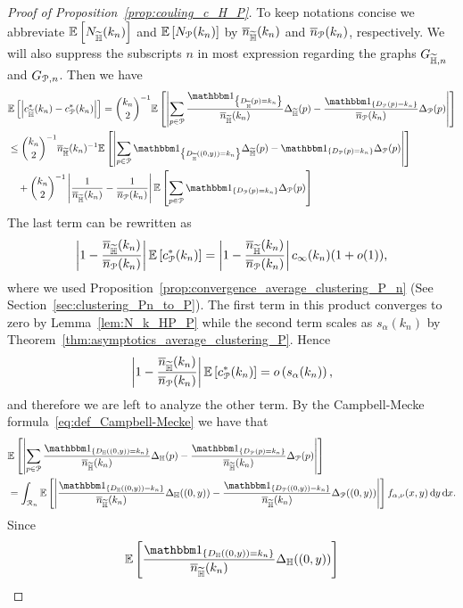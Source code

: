 \begin{proof}[Proof of Proposition~\ref{prop:couling_c_H_P}] 

To keep notations concise we abbreviate $\mathbb{E}\left[N_{\widetilde{\mathbb{H}}} (k_n)\right]$ and $\mathbb{E}\left[N_{{\mathcal P}} (k_n)\right]$ by $\overline{n}_{\widetilde{\mathbb{H}}}(k_n)$ and $\overline{n}_{{\mathcal P}}(k_n)$, respectively. We will also suppress the subscripts $n$ in most expression regarding the graphs $G_{\widetilde{\mathbb{H}},n}$ and $G_{{\mathcal P},n}$. Then we have
\begin{align*} 
	&\Exp{\left|  c_{\HP}^\ast(k_n) - c_{\Pcal}^\ast(k_n)\right|}= 
	\binom{k_n}{2}^{-1}\Exp{\left|\sum_{p \in \Pcal} 
    	\frac{\ind{D_{\HP}(p) = k_n}}{\expH} \Delta_{\HP}(p )
        - \frac{\ind{D_\Pcal(p) = k_n}}{\expP}  \Delta_\Pcal(p)\right|} \\
    &\le\binom{k_n}{2}^{-1} \expH^{-1} \Exp{\left|\sum_{p \in \Pcal} \ind{D_{\HP}((0,y)) = k_n} \Delta_{\HP}(p) 
    	- \ind{D_\Pcal(p) = k_n} \Delta_\Pcal(p)\right|} \\
    &\hspace{10pt}+ \binom{k_n}{2}^{-1} \left|\frac{1}{\expH} - \frac{1}{\expP}\right|\Exp{
        	\sum_{p \in \Pcal} \ind{D_\Pcal(p) = k_n} \Delta_\Pcal(p) }
\end{align*}
The last term can be rewritten as
\begin{align*}
	\left|1 - \frac{\overline{n}_{\widetilde{\mathbb{H}}}(k_n)}{\overline{n}_{{\mathcal P}}(k_n)}\right| \mathbb{E}\left[c_{{\mathcal P}}^\ast(k_n)\right] = \left|1 - \frac{\overline{n}_{\widetilde{\mathbb{H}}}(k_n)}{\overline{n}_{{\mathcal P}}(k_n)}\right|c_\infty(k_n)(1+o(1)),
\end{align*}
where we used Proposition~\ref{prop:convergence_average_clustering_P_n} (See Section~\ref{sec:clustering_Pn_to_P}). The first term in this product converges to zero by Lemma~\ref{lem:N_k_HP_P} while the second term scales as $s_\alpha(k_n)$ by Theorem~\ref{thm:asymptotics_average_clustering_P}. Hence
\[
	\left|1 - \frac{\overline{n}_{\widetilde{\mathbb{H}}}(k_n)}{\overline{n}_{{\mathcal P}}(k_n)}\right| \mathbb{E}\left[c_{{\mathcal P}}^\ast(k_n)\right] = o\left(s_\alpha(k_n)\right),
\]
and therefore we are left to analyze the other term. By the Campbell-Mecke formula~\eqref{eq:def_Campbell-Mecke} we have that
\begin{align*}
	    &\Exp{\left|\sum_{p \in \Pcal} \frac{\ind{D_\H((0,y)) = k_n}}{\expH} \Delta_\H(p) 
	        	- \frac{\ind{D_\Pcal(p) = k_n}}{\expH} \Delta_\Pcal(p)\right|} \\
	    &= \int_{\Rcal_n} 
	        \Exp{\left|\frac{\ind{D_\H((0,y)) = k_n}}{\expH} \Delta_\H ((0,y) ) 
	        - \frac{\ind{D_\Pcal((0,y)) = k_n}}{\expH} \Delta_\Pcal ((0,y))\right|} 
	        	f_{\alpha,\nu}(x,y) \dd y \dd x.
\end{align*}
Since 
\begin{align*}
	\Exp{\frac{\ind{D_\H((0,y)) = k_n}}{\expH} \Delta_\H ((0,y) )}

\end{align*}
\end{proof}
